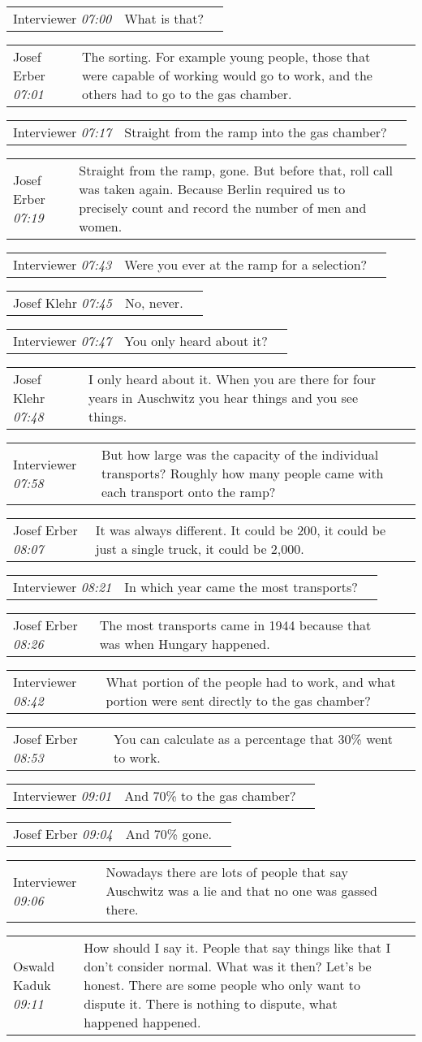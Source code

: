 \documentclass{article}
\newcommand{\I}{Interviewer}
\newcommand{\OK}{Oswald Kaduk}
\newcommand{\JE}{Josef Erber}
\newcommand{\JK}{Josef Klehr}
\newcommand{\dialogueentry}[4]{
    \begin{center}
    \begin{tabular}{p{1in} p{3.5in} p{1.5in}} 
        #2 \newline \textit{#1} & #3 & \small{#4} 
    \end{tabular}
    \end{center}
}
\begin{document}
\dialogueentry{07:00}{\I}{What is that?}{}

\dialogueentry{07:01}{\JE}{The sorting. For example young people, those that were capable of working would go to work, and the others had to go to the gas chamber.}{}

\dialogueentry{07:17}{\I}{Straight from the ramp into the gas chamber?}{}

\dialogueentry{07:19}{\JE}{Straight from the ramp, gone. But before that, roll call was taken again. Because Berlin required us to precisely count and record the number of men and women.}{}

\dialogueentry{07:43}{\I}{Were you ever at the ramp for a selection?}{}

\dialogueentry{07:45}{\JK}{No, never.}{}

\dialogueentry{07:47}{\I}{You only heard about it?}{}

\dialogueentry{07:48}{\JK}{I only heard about it. When you are there for four years in Auschwitz you hear things and you see things.}{}

\dialogueentry{07:58}{\I}{But how large was the capacity of the individual transports? Roughly how many people came with each transport onto the ramp?
}{}

\dialogueentry{08:07}{\JE}{It was always different. It could be 200, it could be just a single truck, it could be 2,000.}{}

\dialogueentry{08:21}{\I}{In which year came the most transports?}{}

\dialogueentry{08:26}{\JE}{The most transports came in 1944 because that was when Hungary happened.}{}

\dialogueentry{08:42}{\I}{What portion of the people had to work, and what portion were sent directly to the gas chamber?}{}

\dialogueentry{08:53}{\JE}{You can calculate as a percentage that 30\% went to work.}{}

\dialogueentry{09:01}{\I}{And 70\% to the gas chamber?}{}

\dialogueentry{09:04}{\JE}{And 70\% gone.}{}

\dialogueentry{09:06}{\I}{Nowadays there are lots of people that say Auschwitz was a lie and that no one was gassed there.}{}

\dialogueentry{09:11}{\OK}{How should I say it. People that say things like that I don't consider normal. What was it then? Let's be honest. There are some people who only want to dispute it. There is nothing to dispute, what happened happened.}{}
\end{document}
